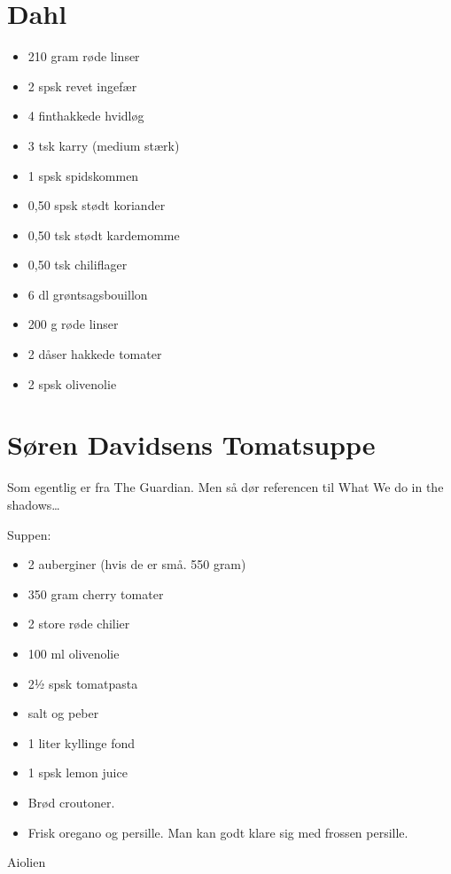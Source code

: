 \documentclass[
]{book}
\providecommand{\tightlist}{%
  \setlength{\itemsep}{0pt}\setlength{\parskip}{0pt}}
\begin{document}
\section{Dahl}\label{dahl}

\begin{itemize}
\tightlist
\item
  210 gram røde linser
\item
  2 spsk revet ingefær
\item
  4 finthakkede hvidløg
\item
  3 tsk karry (medium stærk)
\item
  1 spsk spidskommen
\item
  0,50 spsk stødt koriander
\item
  0,50 tsk stødt kardemomme
\item
  0,50 tsk chiliflager
\item
  6 dl grøntsagsbouillon
\item
  200 g røde linser
\item
  2 dåser hakkede tomater
\item
  2 spsk olivenolie
\end{itemize}

\section{Søren Davidsens Tomatsuppe}\label{suxf8ren-davidsens-tomatsuppe}

Som egentlig er fra The Guardian.
Men så dør referencen til What We do in the shadows\ldots{}

Suppen:

\begin{itemize}
\tightlist
\item
  2 auberginer (hvis de er små. 550 gram)
\item
  350 gram cherry tomater
\item
  2 store røde chilier
\item
  100 ml olivenolie
\item
  2½ spsk tomatpasta
\item
  salt og peber
\item
  1 liter kyllinge fond
\item
  1 spsk lemon juice
\item
  Brød croutoner.
\item
  Frisk oregano og persille. Man kan godt klare sig med frossen persille.
\end{itemize}

Aiolien
\end{document}
